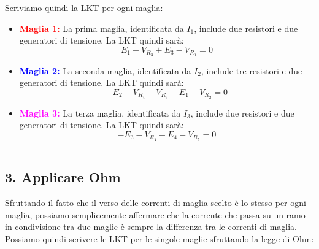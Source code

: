 Scriviamo quindi la LKT per ogni maglia:
\begin{itemize}
    \item \textcolor{red}{\textbf{Maglia 1:}} La prima maglia, identificata da \(I_1\), include due resistori e due generatori di tensione. La LKT quindi sarà:
          \begin{equation}
              E_1 - V_{R_3} + E_3 - V_{R_1} = 0
              \label{eq: prima_maglia}
          \end{equation}
    \item \textcolor{blue}{\textbf{Maglia 2:}} La seconda maglia, identificata da \(I_2\), include tre resistori e due generatori di tensione. La LKT quindi sarà:
          \begin{equation}
              - E_2 - V_{R_4} - V_{R_3} - E_1 - V_{R_2} = 0
              \label{eq: seconda_maglia}
          \end{equation}
    \item \textcolor{magenta}{\textbf{Maglia 3:}} La terza maglia, identificata da \(I_3\), include due resistori e due generatori di tensione. La LKT quindi sarà:
          \begin{equation}
              - E_3 - V_{R_4} - E_4 - V_{R_5} = 0
              \label{eq: terza_maglia}
          \end{equation}
\end{itemize}


\hrule
\subsection*{3. Applicare Ohm}
Sfruttando il fatto che il verso delle correnti di maglia scelto è lo stesso per ogni maglia, possiamo semplicemente affermare che la corrente che passa su un ramo in condivisione tra due maglie è sempre la differenza tra le correnti di maglia.\\

Possiamo quindi scrivere le LKT per le singole maglie sfruttando la legge di Ohm:

